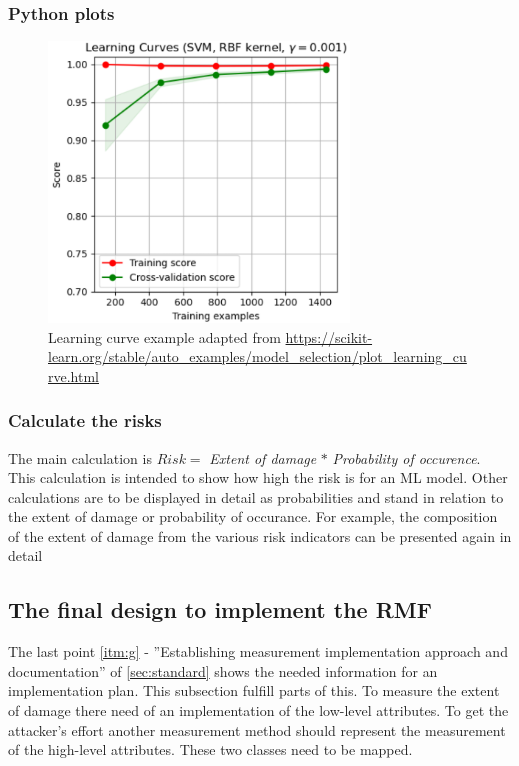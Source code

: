 \subsubsection*{Python plots}

\begin{figure}[ht!]
  \centering
  \includegraphics[width=8cm]{pictures/learning_curve_example.png}
  \caption{Learning curve example adapted from \url{https://scikit-learn.org/stable/auto_examples/model_selection/plot_learning_curve.html}}
  \label{fig:learning_curve_example}
\end{figure}

\subsubsection*{Calculate the risks}

The main calculation is $Risk = $ \textit{Extent of damage} $*$ \textit{Probability of occurence}. This calculation is intended to show how high the risk is for an ML model. Other calculations are to be displayed in detail as probabilities and stand in relation to the extent of damage or probability of occurance. For example, the composition of the extent of damage from the various risk indicators can be presented again in detail

\subsection{The final design to implement the RMF}

The last point \ref{itm:g} - ''Establishing measurement implementation approach and documentation'' of \ref{sec:standard} shows the needed information for an implementation plan. This subsection fulfill parts of this. To measure the extent of damage there need of an implementation of the low-level attributes. To get the attacker's effort another measurement method should represent the measurement of the high-level attributes. These two classes need to be mapped.


